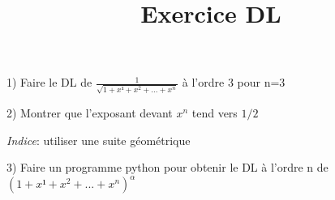 \documentclass{article}
\title{Exercice DL}
\date{}
\begin{document}
\maketitle

1) Faire le DL de  \( \frac{1}{\sqrt{1+x¹+x^2+...+x^n}} \) à l'ordre 3 pour n=3



2) Montrer que l'exposant devant \(x^n\) tend vers \(1/2\) 

\textit{Indice}: utiliser une suite géométrique


3) Faire un programme python pour obtenir le DL à l'ordre n de  \( {(1+x¹+x^2+...+x^n)}^\alpha \)
\end{document}
